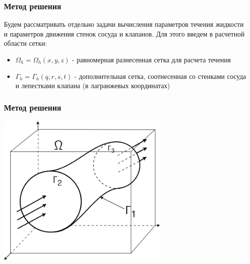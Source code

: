 \documentclass[14pt]{beamer}
\begin{document}
\begin{frame}
\frametitle{Метод решения}
Будем рассматривать отдельно задачи вычисления параметров течения жидкости и параметров движения стенок сосуда и клапанов. Для этого введем в расчетной области сетки:
\begin{itemize}
    \item[\MVRightarrow] $\Omega_h = \Omega_h(x, y, z)$ - равномерная разнесенная сетка для расчета течения
    \item[\MVRightarrow] $\Gamma_h = \Gamma_h(q, r, s, t)$ - дополнительная сетка, соотнесенная со стенками сосуда и лепестками клапана (в лагранжевых координатах)
\end{itemize}

\end{frame}

\begin{frame}
\frametitle{Метод решения}
    \begin{center}
        \includegraphics[width=8.5cm]{area_ibm_3d.png}
    \end{center}
\end{frame}
\end{document}
